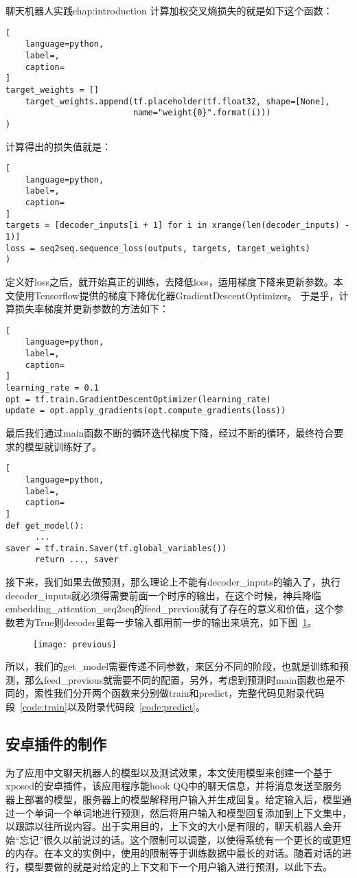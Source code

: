 \begin{cuzchapter}{聊天机器人实践}{chap:introduction}
计算加权交叉熵损失的就是如下这个函数：
\begin{lstlisting}[
    language=python,
    label=,
    caption=
]
target_weights = []
    target_weights.append(tf.placeholder(tf.float32, shape=[None], 
                          name="weight{0}".format(i)))
)
\end{lstlisting}

计算得出的损失值就是：
\begin{lstlisting}[
    language=python,
    label=,
    caption=
]
targets = [decoder_inputs[i + 1] for i in xrange(len(decoder_inputs) - 1)]
loss = seq2seq.sequence_loss(outputs, targets, target_weights)
)
\end{lstlisting}

定义好loss之后，就开始真正的训练，去降低loss，运用梯度下降来更新参数。本文使用Tensorflow提供的梯度下降优化器GradientDescentOptimizer。
于是乎，计算损失率梯度并更新参数的方法如下：
\begin{lstlisting}[
    language=python,
    label=,
    caption=
]
learning_rate = 0.1
opt = tf.train.GradientDescentOptimizer(learning_rate)
update = opt.apply_gradients(opt.compute_gradients(loss))
\end{lstlisting}

最后我们通过main函数不断的循环迭代梯度下降，经过不断的循环，最终符合要求的模型就训练好了。
\begin{lstlisting}[
    language=python,
    label=,
    caption=
]
def get_model():
      ...
saver = tf.train.Saver(tf.global_variables())
      return ..., saver
\end{lstlisting}

接下来，我们如果去做预测，那么理论上不能有decoder\_inputs的输入了，执行decoder\_inputs就必须得需要前面一个时序的输出，在这个时候，神兵降临embedding\_attention\_seq2seq的feed\_previou就有了存在的意义和价值，这个参数若为True则decoder里每一步输入都用前一步的输出来填充，如下图~\ref{previous}。
\begin{figure}[!htbp]
    \centering
    \texttt{[image: previous]}
    \caption[previous]{}
    \label{previous}
\end{figure}

所以，我们的get\_model需要传递不同参数，来区分不同的阶段，也就是训练和预测，那么feed\_previous就需要不同的配置，另外，考虑到预测时main函数也是不同的，索性我们分开两个函数来分别做train和predict，完整代码见附录代码段~\ref{code:train}以及附录代码段~\ref{code:predict}。
\subsection{安卓插件的制作}\label{sec:background}
为了应用中文聊天机器人的模型以及测试效果，本文使用模型来创建一个基于xposed的安卓插件，该应用程序能hook QQ中的聊天信息，并将消息发送至服务器上部署的模型，服务器上的模型解释用户输入并生成回复。给定输入后，模型通过一个单词一个单词地进行预测，然后将用户输入和模型回复添加到上下文集中，以跟踪以往所说内容。出于实用目的，上下文的大小是有限的，聊天机器人会开始“忘记”很久以前说过的话。这个限制可以调整，以使得系统有一个更长的或更短的内存。在本文的实例中，使用的限制等于训练数据中最长的对话。随着对话的进行，模型要做的就是对给定的上下文和下一个用户输入进行预测，以此下去。


\end{cuzchapter}
